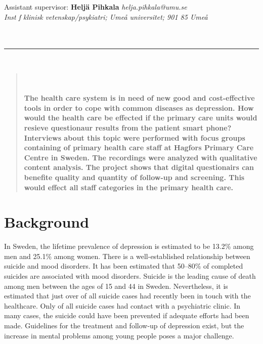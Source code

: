 \documentclass[12pt,a4paper,oneside]{article}
\renewcommand{\_}{\hspace{0.1cm}}
\let\oldcite\cite
\renewcommand*\cite[1]{\textsuperscript{\oldcite{#1}}}
\begin{document}
 {\small Assistant supervisor:} {\small \bf Heljä Pihkala} {\small \it helja.pihkala@umu.se}\\
 {\small\it Inst f klinisk vetenskap/psykiatri; Umeå universitet; 901 85 Umeå}\vspace{.5cm}\\
{\\}\\
\hrule
\ \\
\selectfont

\begin{abstract}
\ \\\vspace{-2em}\ \\
\bfseries{
The health care system is in need of new good and cost-effective tools in order to cope with common diseases as depression. How would the health care be effected if the primary care units would resieve questionaur results from the patient smart phone? Interviews about this topic were performed with focus groups containing of primary health care staff at Hagfors Primary Care Centre in Sweden. The recordings were analyzed with qualitative content analysis. The project shows that digital questionairs can benefite quality and quantity of follow-up and screening. This would effect all staff categories in the primary health care.
}
\end{abstract}

\section*{Background}
In Sweden, the lifetime prevalence of depression is estimated to be 13.2\% among men and 25.1\% among women\cite{numbers0}. There is a well-established relationship between suicide and mood disorders\cite{numbers1.1}. It has been estimated that 50--80\% of completed suicides are associated with mood disorders\cite{numbers1.1}. Suicide is the leading cause of death among men between the ages of 15 and 44 in Sweden\cite{numbers3.0.1}. Nevertheless, it is estimated that just over  of all suicide cases had recently been in touch with the healthcare. Only  of all suicide cases had contact with a psychiatric clinic\cite{numbers2}. In many cases, the suicide could have been prevented if adequate efforts had been made\cite{numbers1}. Guidelines for the treatment and follow-up of depression exist, but the increase in mental problems among young people poses a major challenge\cite{guide1, regionjh1}.
\end{document}
